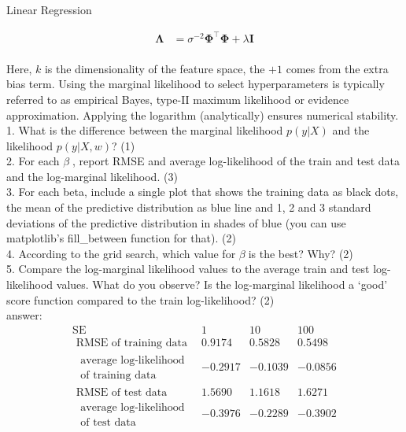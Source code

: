 \documentclass[
	ngerman,
     solution=true
	]{tudaexercise}
\begin{document}
\begin{task}{Linear Regression}
\begin{subtask}[1f)]
\[\begin{aligned}
\boldsymbol{\Lambda}&=\sigma^{-2} \boldsymbol{\Phi}^{\top} \boldsymbol{\Phi}+\lambda \mathbf{I}
\end{aligned}
\]
\\[15pt]
Here, $k$ is the dimensionality of the feature space, the $+1$ comes from the extra bias term.
Using the marginal likelihood to select hyperparameters is typically referred to as empirical Bayes, type-II maximum
likelihood or evidence approximation. Applying the logarithm (analytically) ensures numerical stability.\\[15pt]
1. What is the difference between the marginal likelihood $p(y| X)$ and the likelihood $p(y | X, w)$? (1) \\[15pt]
2. For each $\beta$, report RMSE and average log-likelihood of the train and test data and the log-marginal likelihood.
(3)\\[15pt]
3. For each beta, include a single plot that shows the training data as black dots, the mean of the predictive distribution
as blue line and 1, 2 and 3 standard deviations of the predictive distribution in shades of blue (you can use
matplotlib's fill\_between function for that). (2)\\[15pt]
4. According to the grid search, which value for $\beta$is the best? Why? (2)\\[15pt]
5. Compare the log-marginal likelihood values to the average train and test log-likelihood values. What do you
observe? Is the log-marginal likelihood a ‘good’ score function compared to the train log-likelihood? (2)\\
answer:\\[15pt]
\[
\begin{array}{|c|c|c|c|}
\hline \mathrm{SE} & 1 & 10 & 100 \\
\hline \text { RMSE of training data } & 0.9174 & 0.5828 & 0.5498 \\
\hline \begin{array}{c}
\text { average log-likelihood } \\
\text { of training data }
\end{array} & -0.2917 & -0.1039 & -0.0856 \\
\hline \text { RMSE of test data } & 1.5690 & 1.1618 & 1.6271 \\
\hline \begin{array}{c}
\text { average log-likelihood } \\
\text { of test data }
\end{array} & -0.3976 & -0.2289 & -0.3902 \\

\end{array}\]
\end{subtask}
\end{task}
\end{document}
